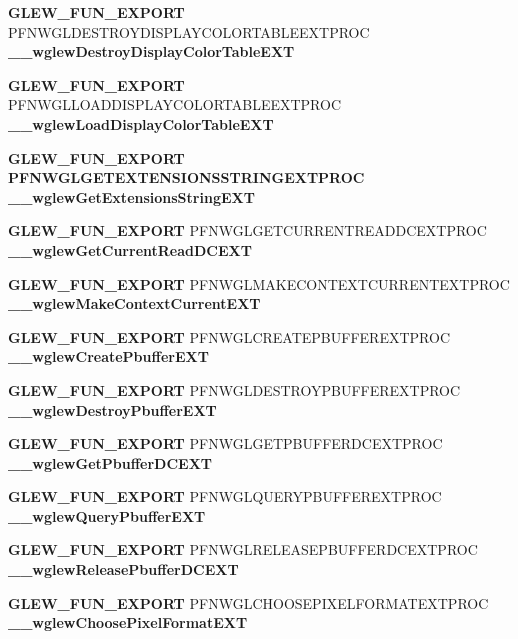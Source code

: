 \begin{DoxyCompactItemize}
\item 
{\bf G\+L\+E\+W\+\_\+\+F\+U\+N\+\_\+\+E\+X\+P\+O\+RT} P\+F\+N\+W\+G\+L\+D\+E\+S\+T\+R\+O\+Y\+D\+I\+S\+P\+L\+A\+Y\+C\+O\+L\+O\+R\+T\+A\+B\+L\+E\+E\+X\+T\+P\+R\+OC {\bf \+\_\+\+\_\+wglew\+Destroy\+Display\+Color\+Table\+E\+XT}
\item 
{\bf G\+L\+E\+W\+\_\+\+F\+U\+N\+\_\+\+E\+X\+P\+O\+RT} P\+F\+N\+W\+G\+L\+L\+O\+A\+D\+D\+I\+S\+P\+L\+A\+Y\+C\+O\+L\+O\+R\+T\+A\+B\+L\+E\+E\+X\+T\+P\+R\+OC {\bf \+\_\+\+\_\+wglew\+Load\+Display\+Color\+Table\+E\+XT}
\item 
{\bf G\+L\+E\+W\+\_\+\+F\+U\+N\+\_\+\+E\+X\+P\+O\+RT} {\bf P\+F\+N\+W\+G\+L\+G\+E\+T\+E\+X\+T\+E\+N\+S\+I\+O\+N\+S\+S\+T\+R\+I\+N\+G\+E\+X\+T\+P\+R\+OC} {\bf \+\_\+\+\_\+wglew\+Get\+Extensions\+String\+E\+XT}
\item 
{\bf G\+L\+E\+W\+\_\+\+F\+U\+N\+\_\+\+E\+X\+P\+O\+RT} P\+F\+N\+W\+G\+L\+G\+E\+T\+C\+U\+R\+R\+E\+N\+T\+R\+E\+A\+D\+D\+C\+E\+X\+T\+P\+R\+OC {\bf \+\_\+\+\_\+wglew\+Get\+Current\+Read\+D\+C\+E\+XT}
\item 
{\bf G\+L\+E\+W\+\_\+\+F\+U\+N\+\_\+\+E\+X\+P\+O\+RT} P\+F\+N\+W\+G\+L\+M\+A\+K\+E\+C\+O\+N\+T\+E\+X\+T\+C\+U\+R\+R\+E\+N\+T\+E\+X\+T\+P\+R\+OC {\bf \+\_\+\+\_\+wglew\+Make\+Context\+Current\+E\+XT}
\item 
{\bf G\+L\+E\+W\+\_\+\+F\+U\+N\+\_\+\+E\+X\+P\+O\+RT} P\+F\+N\+W\+G\+L\+C\+R\+E\+A\+T\+E\+P\+B\+U\+F\+F\+E\+R\+E\+X\+T\+P\+R\+OC {\bf \+\_\+\+\_\+wglew\+Create\+Pbuffer\+E\+XT}
\item 
{\bf G\+L\+E\+W\+\_\+\+F\+U\+N\+\_\+\+E\+X\+P\+O\+RT} P\+F\+N\+W\+G\+L\+D\+E\+S\+T\+R\+O\+Y\+P\+B\+U\+F\+F\+E\+R\+E\+X\+T\+P\+R\+OC {\bf \+\_\+\+\_\+wglew\+Destroy\+Pbuffer\+E\+XT}
\item 
{\bf G\+L\+E\+W\+\_\+\+F\+U\+N\+\_\+\+E\+X\+P\+O\+RT} P\+F\+N\+W\+G\+L\+G\+E\+T\+P\+B\+U\+F\+F\+E\+R\+D\+C\+E\+X\+T\+P\+R\+OC {\bf \+\_\+\+\_\+wglew\+Get\+Pbuffer\+D\+C\+E\+XT}
\item 
{\bf G\+L\+E\+W\+\_\+\+F\+U\+N\+\_\+\+E\+X\+P\+O\+RT} P\+F\+N\+W\+G\+L\+Q\+U\+E\+R\+Y\+P\+B\+U\+F\+F\+E\+R\+E\+X\+T\+P\+R\+OC {\bf \+\_\+\+\_\+wglew\+Query\+Pbuffer\+E\+XT}
\item 
{\bf G\+L\+E\+W\+\_\+\+F\+U\+N\+\_\+\+E\+X\+P\+O\+RT} P\+F\+N\+W\+G\+L\+R\+E\+L\+E\+A\+S\+E\+P\+B\+U\+F\+F\+E\+R\+D\+C\+E\+X\+T\+P\+R\+OC {\bf \+\_\+\+\_\+wglew\+Release\+Pbuffer\+D\+C\+E\+XT}
\item 
{\bf G\+L\+E\+W\+\_\+\+F\+U\+N\+\_\+\+E\+X\+P\+O\+RT} P\+F\+N\+W\+G\+L\+C\+H\+O\+O\+S\+E\+P\+I\+X\+E\+L\+F\+O\+R\+M\+A\+T\+E\+X\+T\+P\+R\+OC {\bf \+\_\+\+\_\+wglew\+Choose\+Pixel\+Format\+E\+XT}

\end{DoxyCompactItemize}
